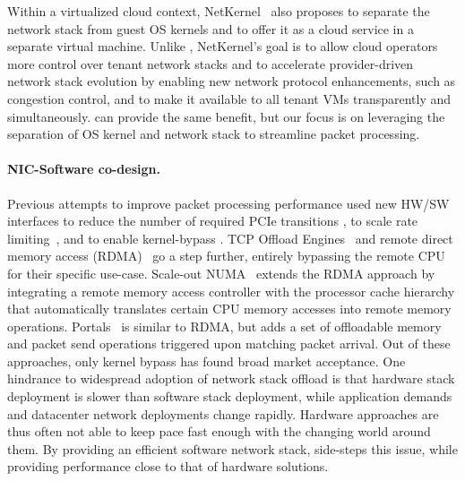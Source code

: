 
Within a virtualized cloud context, NetKernel~\cite{netkernel} also
proposes to separate the network stack from guest OS kernels and to
offer it as a cloud service in a separate virtual machine. Unlike
\softtcp, NetKernel's goal is to allow cloud operators more control
over tenant network stacks and to accelerate provider-driven network
stack evolution by enabling new network protocol enhancements, such as
congestion control, and to make it available to all tenant VMs
transparently and simultaneously. \softtcp can provide the same
benefit, but our focus is on leveraging the separation of OS kernel
and network stack to streamline packet processing.

\paragraph{NIC-Software co-design.}
Previous attempts to improve packet processing performance used new
HW/SW interfaces to reduce the number of required PCIe transitions
\cite{flajslik:llnic,binkert:inic}, to scale rate
limiting~\cite{senic}, and to enable kernel-bypass
\cite{pratt:arsenic,voneicken:unet,druschel:osiris}. TCP Offload
Engines~\cite{toe,chelsio_toe} and remote direct memory access
(RDMA)~\cite{rdma} go a step further, entirely bypassing the remote
CPU for their specific use-case. Scale-out
NUMA~\cite{novakovic:sonuma} extends the RDMA approach by integrating
a remote memory access controller with the processor cache hierarchy
that automatically translates certain CPU memory accesses into remote
memory operations. Portals~\cite{portals_spec} is similar to RDMA, but
adds a set of offloadable memory and packet send operations triggered
upon matching packet arrival. Out of these approaches, only kernel
bypass has found broad market acceptance. One hindrance to widespread
adoption of network stack offload is that hardware stack deployment is
slower than software stack deployment, while application demands and
datacenter network deployments change rapidly. Hardware approaches are
thus often not able to keep pace fast enough with the changing world
around them. By providing an efficient software network stack,
\softtcp side-steps this issue, while providing performance close to
that of hardware solutions.

